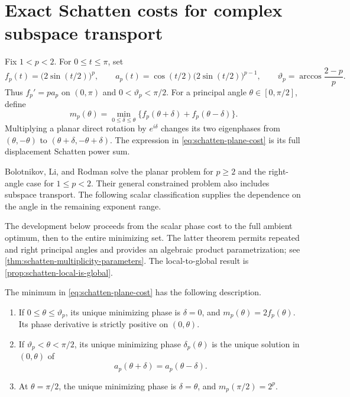 \section{Exact Schatten costs for complex subspace transport}
\label{sec:schatten-optimization}

Fix $1<p<2$. For $0\leq t\leq\pi$, set
\[
 f_p(t)=\bigl(2\sin(t/2)\bigr)^p,
 \qquad
 a_p(t)=\cos(t/2)\bigl(2\sin(t/2)\bigr)^{p-1},
 \qquad
 \vartheta_p=\arccos\frac{2-p}{p}.
\]
Thus $f_p'=p a_p$ on $(0,\pi)$ and $0<\vartheta_p<\pi/2$.
For a principal angle $\theta\in[0,\pi/2]$, define
\begin{equation}
 m_p(\theta)=\min_{0\leq\delta\leq\theta}
       \{f_p(\theta+\delta)+f_p(\theta-\delta)\}.
 \label{eq:schatten-plane-cost}
\end{equation}
Multiplying a planar direct rotation by $e^{i\delta}$ changes its two
eigenphases from $(\theta,-\theta)$ to $(\theta+\delta,-\theta+\delta)$.
The expression in \cref{eq:schatten-plane-cost} is its full displacement
Schatten power sum.

Bolotnikov, Li, and Rodman \citep[Lemmas~3.2--3.3]{bolotnikov2001minimal}
solve the planar problem for $p\geq2$ and the right-angle case for
$1\leq p<2$. Their general constrained problem also includes subspace
transport. The following scalar classification supplies the dependence on
the angle in the remaining exponent range.

The development below proceeds from the scalar phase cost to the full
ambient optimum, then to the entire minimizing set. The latter theorem
permits repeated and right principal angles and provides an algebraic
product parametrization; see
\cref{thm:schatten-multiplicity-parameters}. The local-to-global result
is \cref{prop:schatten-local-is-global}.

\begin{proposition}
\label{prop:schatten-scalar-diagram}
The minimum in \cref{eq:schatten-plane-cost} has the following description.
\begin{enumerate}
 \item If $0\leq\theta\leq\vartheta_p$, its unique minimizing phase is
 $\delta=0$, and $m_p(\theta)=2f_p(\theta)$. Its phase derivative is
 strictly positive on $(0,\theta)$.
 \item If $\vartheta_p<\theta<\pi/2$, its unique minimizing phase
 $\delta_p(\theta)$ is the unique solution in $(0,\theta)$ of
 \begin{equation}
    a_p(\theta+\delta)=a_p(\theta-\delta).
    \label{eq:schatten-stationary-balance}
 \end{equation}
 \item At $\theta=\pi/2$, the unique minimizing phase is $\delta=\theta$,
 and $m_p(\pi/2)=2^p$.
\end{enumerate}
\end{proposition}


